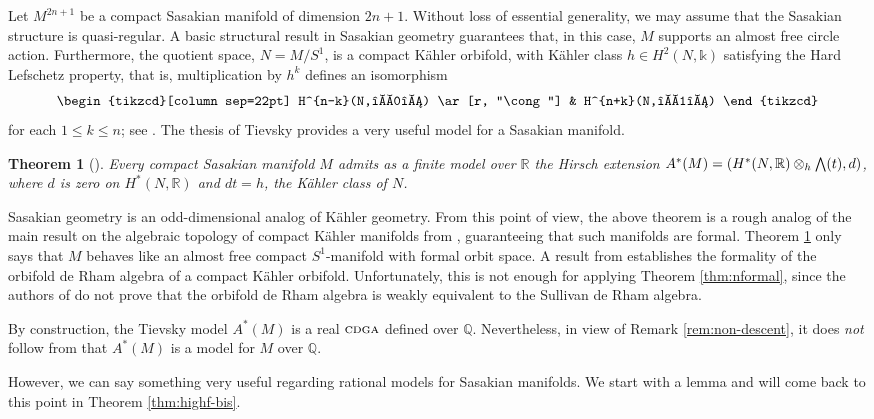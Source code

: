 \documentclass{article}
\numberwithin{equation}{section}
\newtheorem{theorem}{Theorem}[section]
\theoremstyle{definition}
\newcommand{\Q}{\mathbb{Q}}
\newcommand{\R}{\mathbb{R}}
\renewcommand{\k}{\mathbb{k}}
\newcommand{\cdga}{\ensuremath{\textsc{cdga}}}
\newcommand{\bwedge}{\mbox{\normalsize $\bigwedge$}}
\begin{document}
Let $M^{2n+1}$ be a compact Sasakian manifold of dimension $2n+1$.  
Without loss of essential generality, we may assume that the Sasakian 
structure is quasi-regular.   A basic structural result in Sasakian geometry 
guarantees that, in this case, $M$ supports an almost free circle action.  
Furthermore, the quotient space, $N=M/S^1$, is a compact K\"{a}hler orbifold, 
with K\"{a}hler class $h\in H^2(N,\k)$ satisfying the Hard Lefschetz property, 
that is, multiplication by $h^k$ defines an isomorphism 
\begin{equation}
\label{eq:hardlef}
\begin{tikzcd}[column sep=22pt]
H^{n-k}(N,\k) \ar[r, "\cong"] & H^{n+k}(N,\k)
\end{tikzcd}
\end{equation}
for each $1\le k\le n$; see 
\cite[Proposition 7.2.2 and Theorem 7.2.9]{BG}.
The thesis of Tievsky \cite[\S 4.3]{Ti} provides a very useful model 
for a Sasakian manifold.

\begin{theorem}[\cite{Ti}]
\label{thm:sasmodel}
Every compact Sasakian manifold $M$ admits as a finite model over $\R$ the Hirsch 
extension $A^{*}(M)=(H^{*}(N,\R)\otimes _h \bwedge(t), d)$, 
where $d$ is zero on $H^{*}(N,\R)$ and $dt=h$, 
the K\"{a}hler class of $N$.  
\end{theorem}

Sasakian geometry is an odd-dimensional analog of K\"{a}hler 
geometry.  From this point of view, the above theorem is a 
rough analog of the main result on the algebraic topology 
of compact K\"ahler manifolds from \cite{DGMS}, guaranteeing 
that such manifolds are formal. Theorem \ref{thm:sasmodel} only says that 
$M$ behaves like an almost free compact $S^1$-manifold with formal orbit space.
A result from \cite{BB+} establishes the formality of the orbifold de Rham algebra 
of a compact K\"{a}hler orbifold. Unfortunately, this is not enough for applying Theorem 
\ref{thm:nformal}, since the authors of \cite{BB+} do not prove that the orbifold
de Rham algebra is weakly equivalent to the Sullivan de Rham algebra. 

By construction, the Tievsky model $A^{*}(M)$ is a real $\cdga$ defined 
over $\Q$. Nevertheless, in view of Remark \ref{rem:non-descent}, 
it does {\em not}\/ follow from \cite{Ti} that $A^{*}(M)$ 
is a model for $M$ over $\Q$.  

However, we can say something very useful 
regarding rational models for Sasakian manifolds.  We start 
with a lemma and will come back to this point in 
Theorem \ref{thm:highf-bis}.
\end{document}
